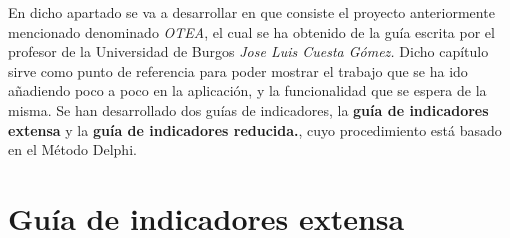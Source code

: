 
En dicho apartado se va a desarrollar en que consiste el proyecto anteriormente
mencionado denominado \textit{OTEA}, el cual se ha obtenido de la guía escrita
por el profesor de la Universidad de Burgos \textit{Jose Luis Cuesta
Gómez.}\cite{gómez2009trastornos} Dicho capítulo sirve como punto de referencia
para poder mostrar el trabajo que se ha ido añadiendo poco a poco en la
aplicación, y la funcionalidad que se espera de la misma. Se han desarrollado
dos guías de indicadores, la \textbf{guía de indicadores extensa} y la
\textbf{guía de indicadores reducida.}, cuyo procedimiento está basado en el Método Delphi.

\section{Guía de indicadores extensa}
